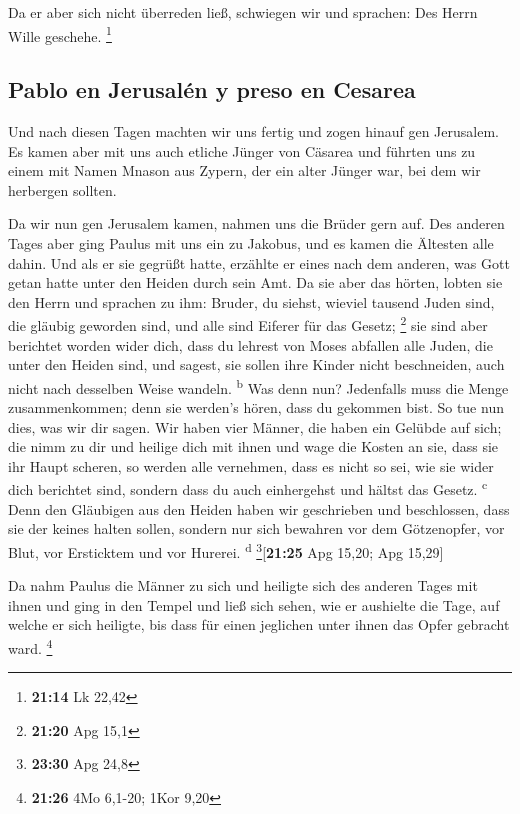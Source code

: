  Da er aber sich nicht überreden ließ, schwiegen wir und
sprachen: Des Herrn Wille geschehe. \footnote{\textbf{21:14} Lk 22,42}

\hypertarget{pablo-en-jerusaluxe9n-y-preso-en-cesarea}{%
\subsection{Pablo en Jerusalén y preso en
Cesarea}\label{pablo-en-jerusaluxe9n-y-preso-en-cesarea}}

 Und nach diesen Tagen machten wir uns fertig und zogen
hinauf gen Jerusalem.  Es kamen aber mit uns auch etliche
Jünger von Cäsarea und führten uns zu einem mit Namen Mnason aus Zypern,
der ein alter Jünger war, bei dem wir herbergen sollten.

 Da wir nun gen Jerusalem kamen, nahmen uns die Brüder
gern auf.  Des anderen Tages aber ging Paulus mit uns ein
zu Jakobus, und es kamen die Ältesten alle dahin.  Und
als er sie gegrüßt hatte, erzählte er eines nach dem anderen, was Gott
getan hatte unter den Heiden durch sein Amt.  Da sie aber
das hörten, lobten sie den Herrn und sprachen zu ihm: Bruder, du siehst,
wieviel tausend Juden sind, die gläubig geworden sind, und alle sind
Eiferer für das Gesetz; \footnote{\textbf{21:20} Apg 15,1}
 sie sind aber berichtet worden wider dich, dass du
lehrest von Moses abfallen alle Juden, die unter den Heiden sind, und
sagest, sie sollen ihre Kinder nicht beschneiden, auch nicht nach
desselben Weise wandeln. \textsuperscript{b}  Was denn
nun? Jedenfalls muss die Menge zusammenkommen; denn sie werden's hören,
dass du gekommen bist.  So tue nun dies, was wir dir
sagen.  Wir haben vier Männer, die haben ein Gelübde auf
sich; die nimm zu dir und heilige dich mit ihnen und wage die Kosten an
sie, dass sie ihr Haupt scheren, so werden alle vernehmen, dass es nicht
so sei, wie sie wider dich berichtet sind, sondern dass du auch
einhergehst und hältst das Gesetz. \textsuperscript{c} 
Denn den Gläubigen aus den Heiden haben wir geschrieben und beschlossen,
dass sie der keines halten sollen, sondern nur sich bewahren vor dem
Götzenopfer, vor Blut, vor Ersticktem und vor Hurerei.
\textsuperscript{d} \footnote{\textbf{23:30} Apg 24,8}{[}\textbf{21:25}
Apg 15,20; Apg 15,29{]}

 Da nahm Paulus die Männer zu sich und heiligte sich des
anderen Tages mit ihnen und ging in den Tempel und ließ sich sehen, wie
er aushielte die Tage, auf welche er sich heiligte, bis dass für einen
jeglichen unter ihnen das Opfer gebracht ward. \footnote{\textbf{21:26}
  4Mo 6,1-20; 1Kor 9,20}

